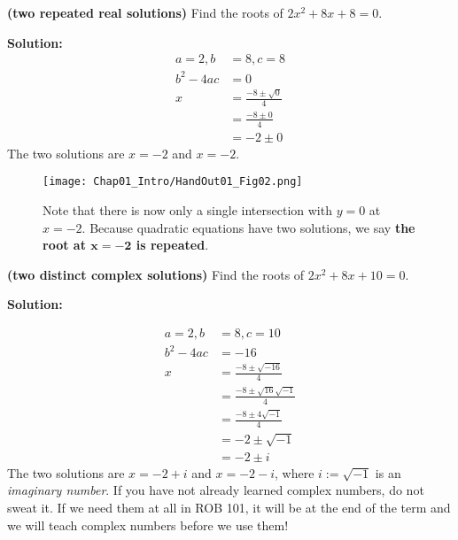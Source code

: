 \newpage
\begin{example}
\label{ex:QuadRepeatedRealSolutions}
\textbf{(two repeated real solutions)}  Find the roots of $2x^2 +8 x + 8 =0$.
\end{example}

\textbf{Solution:}
\begin{align*}
        a=2, b&=8, c=8\\
    b^2-4ac&= 0\\
    x&=  \frac{-8 \pm \sqrt{0}}{4} \\
    &=  \frac{-8\pm 0}{4} \\
    &= -2 \pm 0
    \end{align*}
    The two solutions are $x=-2$ and $x=-2$.
\Qed
 

\begin{figure}[hbt!]
\centering
\texttt{[image: Chap01\_Intro/HandOut01\_Fig02.png]}
\caption[]{Note that there is now only a single intersection with $y=0$ at $x=-2$. Because quadratic equations have two solutions, we say \textbf{the root at $\mathbf{x=-2}$ is repeated}.}
\end{figure}




\begin{example}
\label{ex:QuadDistinctComplexSolutions}
\textbf{(two distinct complex solutions)}  Find the roots of $2x^2 +8 x + 10 =0$.
\end{example}

\textbf{Solution:}

\begin{align*}
        a=2, b&=8, c=10\\
    b^2-4ac&= -16\\
    x&=  \frac{-8 \pm \sqrt{-16}}{4} \\
    &=  \frac{-8\pm\sqrt{16} \sqrt{-1}}{4} \\
      &=  \frac{-8\pm 4\sqrt{-1}}{4} \\
       &=  -2\pm \sqrt{-1} \\
    &= -2 \pm i
    \end{align*}
    The two solutions are $x=-2+i$ and $x=-2-i$, where $i:=\sqrt{-1}$ is an \textit{imaginary number}. If you have not already learned complex numbers, do not sweat it. If we need them at all in ROB 101, it will be at the end of the term and we will teach complex numbers before we use them!
\Qed

